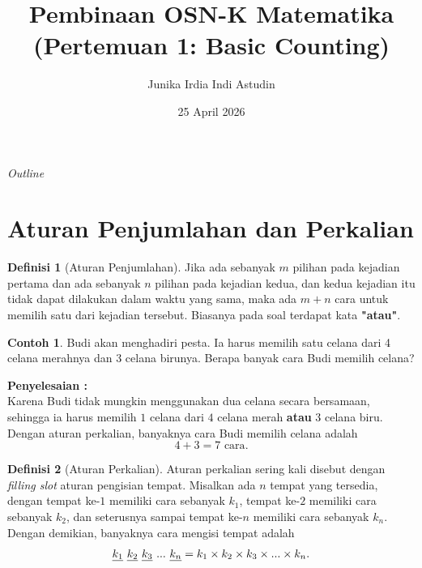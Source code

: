 \documentclass[aspectratio=169]{beamer}
\date{25 April 2026}
\title[OSK Matematika - Kombinatorika]{Pembinaan OSN-K Matematika\\(Pertemuan 1: Basic Counting)}
\author[Junika]{Junika Irdia Indi Astudin}
\institute[MAN 1 Pasuruan]{MAN 1 Pasuruan}
\theoremstyle{definition}
\newtheorem{definisi}{Definisi}
\newtheorem{contoh}{Contoh}
\begin{document}
\begin{frame}
  \titlepage
\end{frame}

\begin{frame}{\textit{Outline}}
  \tableofcontents
\end{frame}
\section{Aturan Penjumlahan dan Perkalian}

\begin{frame}{\insertsection}{\insertsection}
  \begin{definisi}[Aturan Penjumlahan]
    Jika ada sebanyak $m$ pilihan pada kejadian pertama dan ada sebanyak $n$ pilihan pada kejadian kedua, dan kedua kejadian itu tidak dapat dilakukan dalam waktu yang sama, maka ada $m+n$ cara untuk memilih satu dari kejadian tersebut. Biasanya pada soal terdapat kata \textbf{"atau"}.
  \end{definisi}
\end{frame}

\begin{frame}{\insertsection}{\insertsection}
  \begin{contoh}
    Budi akan menghadiri pesta. Ia harus memilih satu celana dari 4 celana merahnya dan 3 celana birunya. Berapa banyak cara Budi memilih celana?

    \textbf{Penyelesaian : }\\
    Karena Budi tidak mungkin menggunakan dua celana secara bersamaan, sehingga ia harus memilih $1$ celana dari $4$ celana merah \textbf{atau} $3$ celana biru. Dengan aturan perkalian, banyaknya cara Budi memilih celana adalah
    $$4+3=7 \text{ cara}.$$
  \end{contoh}
\end{frame}

\begin{frame}{\insertsection}{\insertsection}
  \begin{definisi}[Aturan Perkalian]
    Aturan perkalian sering kali disebut dengan \textit{filling slot }aturan pengisian tempat.
    Misalkan ada $n$ tempat yang tersedia, dengan tempat ke-$1$ memiliki cara sebanyak $k_1$, tempat ke-$2$ memiliki cara sebanyak $k_2$, dan seterusnya sampai tempat ke-$n$ memiliki cara sebanyak $k_n$. Dengan demikian, banyaknya cara mengisi tempat adalah
    \begin{align}
      \uline{k_1} \ \uline{k_2} \ \uline{k_3} \ ... \ \uline{k_n} = k_1 \times k_2 \times k_3 \times ... \times k_n.
    \end{align}
  \end{definisi}
\end{frame}
\end{document}
